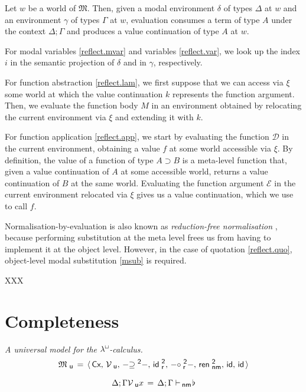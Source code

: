 \documentclass{entcs}
\numberwithin{equation}{thm}
\newcommand{\lambdabox}{\lambda^{\mkern-1mu\sq\mkern-2mu}}
\newcommand{\binop}[1]{-\mathord{#1}-}
\newcommand{\tsf}[1]{\textsf{\upshape{#1}}}
\newcommand{\stsf}[1]{\smash{\tsf{\small{#1}}}}
\renewcommand{\:}{\mathrel{:}}
\newcommand{\id}{\operatorname{\tsf{id}}}
\newcommand{\0}{\varnothing}
\newcommand{\geqZ}{\mathrel{\supseteq^{\stsf{2}}}}
\newcommand{\ideZ}{\operatorname{\tsf{id}_{\stsf{r}}^{\stsf{2}}}}
\newcommand{\compeZ}{\mathrel{\circ_{\mkern-1mu\stsf{r}}^{\stsf{2}}}}
\newcommand{\base}{\flat}
\newcommand{\imp}{\mathbin{\supset}}
\newcommand{\sq}{\Box}
\newcommand{\Cx}{\tsf{Cx}}
\newcommand{\D}{\mathcal{D}}
\newcommand{\E}{\mathcal{E}}
\newcommand{\enm}{\mathrel{\vdash_{\mkern-2mu\stsf{nm}}}}
\newcommand{\rennmZ}{\operatorname{\tsf{ren}_{\stsf{nm}}^{\stsf{2}}}}
\newcommand{\M}{\mathfrak{M}}
\newcommand{\Mu}{\mathfrak{M}_{\stsf{u}}}
\newcommand{\Vu}{\mathcal{V}_{\stsf{u}}}
\begin{document}
Let $w$ be a world of $\M$.  
Then, given a modal environment $\delta$ of types $\Delta$ at $w$ and an environment $\gamma$ of types $\Gamma$ at $w$, evaluation consumes a term of type $A$ under the context $\Delta; \Gamma$ and produces a value continuation of type $A$ at $w$.

For modal variables \eqref{reflect.mvar} and variables \eqref{reflect.var}, we look up the index $i$ in the semantic projection of $\delta$ and in $\gamma$, respectively.

For function abstraction \eqref{reflect.lam}, we first suppose that we can access via $\xi$ some world at which the value continuation $k$ represents the function argument.
Then, we evaluate the function body $M$ in an environment obtained by relocating the current environment via $\xi$ and extending it with $k$.

For function application \eqref{reflect.app}, we start by evaluating the function $\D$ in the current environment, obtaining a value $f$ at some world accessible via $\xi$.
By definition, the value of a function of type $A \imp B$ is a meta-level function that, given a value continuation of $A$ at some accessible world, returns a value continuation of $B$ at the same world.
Evaluating the function argument $\E$ in the current environment relocated via $\xi$ gives us a value continuation, which we use to call $f$.

Normalisation-by-evaluation is also known as \emph{reduction-free normalisation} \cite{AltenkirchHS1995,Danvy2005}, because performing substitution at the meta level frees us from having to implement it at the object level.
However, in the case of quotation \eqref{reflect.quo}, object-level modal substitution \eqref{msub} is required.

XXX


\section{Completeness}

\begin{definition}
  \label{Mu}
  \emph{A universal model for the $\lambdabox$-calculus.}
  \begin{gather*}
    \Mu \,=\, \langle\,\Cx,\,\Vu,\,\binop{\geqZ},\,\ideZ,\,\binop{\compeZ},\,\rennmZ,\,\id,\,\id\,\rangle\\[0.5\baselineskip]
    \Delta; \Gamma \Vu x \,=\, \Delta; \Gamma \enm \mkern-4mu \base
  \end{gather*}
\end{definition}
\end{document}
